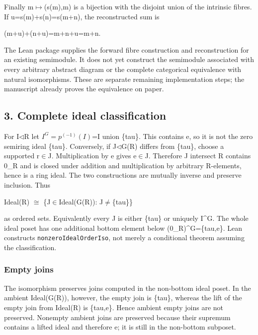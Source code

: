 Finally m\ensuremath{\mapsto}(s(m),m) is a bijection with the disjoint union of the
intrinsic fibres. If u=s(m)+s(n)=s(m+n), the reconstructed sum is

(m+u)+(n+u)=m+n+u=m+n.

The Lean package supplies the forward fibre construction and
reconstruction for an existing semimodule. It does not yet construct the
semimodule associated with every arbitrary abstract diagram or the
complete categorical equivalence with natural isomorphisms. These are
separate remaining implementation steps; the manuscript already proves
the equivalence on paper.

\subsection{3. Complete ideal
classification}\label{InheritedStructuralStage:complete-ideal-classification}

For I\ensuremath{\triangleleft}R let \(I^G=p^{(-1)}(I)\)=I union \{tau\}. This contains
e, so it is not the zero semiring ideal \{tau\}. Conversely, if J\ensuremath{\triangleleft}G(R)
differs from \{tau\}, choose a supported r\ensuremath{\in}J. Multiplication by e gives
e\ensuremath{\in}J. Therefore J intersect R contains 0\_R and is closed under addition
and multiplication by arbitrary R-elements, hence is a ring ideal. The
two constructions are mutually inverse and preserve inclusion. Thus

Ideal(R) \ensuremath{\cong} \{J\ensuremath{\in}Ideal(G(R)): J\ensuremath{\ne}\{tau\}\}

as ordered sets. Equivalently every J is either \{tau\} or uniquely
I\^{}G. The whole ideal poset has one additional bottom element below
(0\_R)\^{}G=\{tau,e\}. Lean constructs \texttt{nonzeroIdealOrderIso},
not merely a conditional theorem assuming the classification.

\subsubsection{Empty joins}\label{InheritedStructuralStage:empty-joins}

The isomorphism preserves joins computed in the non-bottom ideal poset.
In the ambient Ideal(G(R)), however, the empty join is \{tau\}, whereas
the lift of the empty join from Ideal(R) is \{tau,e\}. Hence ambient
empty joins are not preserved. Nonempty ambient joins are preserved
because their supremum contains a lifted ideal and therefore e; it is
still in the non-bottom subposet.

